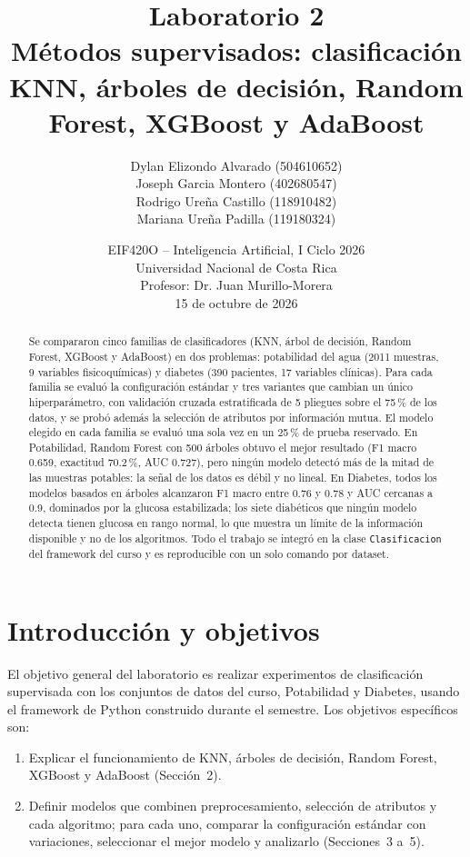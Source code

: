 \documentclass[11pt]{article}
\title{\textbf{Laboratorio 2}\\[2pt] Métodos supervisados: clasificación\\[2pt]\large KNN, árboles de decisión, Random Forest, XGBoost y AdaBoost}
\author{Dylan Elizondo Alvarado (504610652)\\Joseph Garcia Montero (402680547)\\Rodrigo Ureña Castillo (118910482)\\Mariana Ureña Padilla (119180324)}
\date{EIF420O -- Inteligencia Artificial, I Ciclo 2026\\Universidad Nacional de Costa Rica\\Profesor: Dr. Juan Murillo-Morera\\15 de octubre de 2026}
\begin{document}
\maketitle

\begin{abstract}

Se compararon cinco familias de clasificadores (KNN, árbol de decisión, Random
Forest, XGBoost y AdaBoost) en dos problemas: potabilidad del agua (2011 muestras,
9 variables fisicoquímicas) y diabetes (390 pacientes, 17 variables clínicas). Para
cada familia se evaluó la configuración estándar y tres variantes que cambian un
único hiperparámetro, con validación cruzada estratificada de 5 pliegues sobre el
75\,\% de los datos, y se probó además la selección de atributos por información
mutua. El modelo elegido en cada familia se evaluó una sola vez en un 25\,\% de
prueba reservado. En Potabilidad, Random Forest con 500 árboles obtuvo el mejor
resultado (F1 macro 0.659, exactitud 70.2\,\%, AUC 0.727), pero ningún modelo
detectó más de la mitad de las muestras potables: la señal de los datos es débil y
no lineal. En Diabetes, todos los modelos basados en árboles alcanzaron F1 macro
entre 0.76 y 0.78 y AUC cercanas a 0.9, dominados por la glucosa estabilizada; los
siete diabéticos que ningún modelo detecta tienen glucosa en rango normal, lo que
muestra un límite de la información disponible y no de los algoritmos. Todo el
trabajo se integró en la clase \texttt{Clasificacion} del framework del curso y es
reproducible con un solo comando por dataset.


\end{abstract}

\tableofcontents

\clearpage

\section{Introducción y objetivos}

El objetivo general del laboratorio es realizar experimentos de clasificación
supervisada con los conjuntos de datos del curso, Potabilidad y Diabetes, usando el
framework de Python construido durante el semestre. Los objetivos específicos son:

\begin{enumerate}
\item Explicar el funcionamiento de KNN, árboles de decisión, Random Forest,
XGBoost y AdaBoost (Sección~2).
\item Definir modelos que combinen preprocesamiento, selección de atributos y cada
algoritmo; para cada uno, comparar la configuración estándar con variaciones,
seleccionar el mejor modelo y analizarlo (Secciones~3 a~5).
\end{enumerate}
\end{document}
